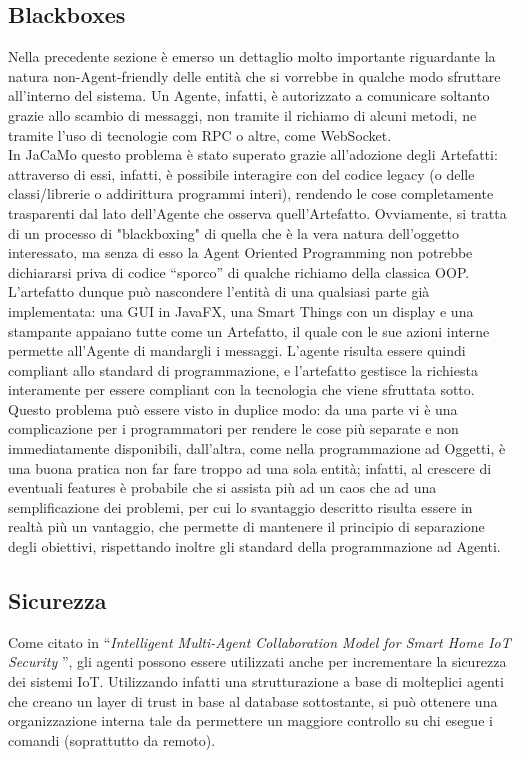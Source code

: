 \documentclass[12pt,a4paper,openright,oneside]{report}
\newcommand{\quotes}[1]{``#1''}
\begin{document}
\subsection{Blackboxes}
Nella precedente sezione è emerso un dettaglio molto importante riguardante la natura non-Agent-friendly delle entità che si vorrebbe in qualche modo sfruttare all'interno del sistema. Un Agente, infatti, è autorizzato a comunicare soltanto grazie allo scambio di messaggi, non tramite il richiamo di alcuni metodi, ne tramite l'uso di tecnologie com RPC o altre, come WebSocket.\\

In JaCaMo questo problema è stato superato grazie all'adozione degli Artefatti: attraverso di essi, infatti, è possibile interagire con del codice legacy (o delle classi/librerie o addirittura programmi interi), rendendo le cose completamente trasparenti dal lato dell'Agente che osserva quell'Artefatto. Ovviamente, si tratta di un processo di "blackboxing" di quella che è la vera natura dell'oggetto interessato, ma senza di esso la Agent Oriented Programming non potrebbe dichiararsi priva di codice \quotes{sporco} di qualche richiamo della classica OOP.\\

L'artefatto dunque può nascondere l'entità di una qualsiasi parte già implementata: una GUI in JavaFX, una Smart Things con un display e una stampante appaiano tutte come un Artefatto, il quale con le sue azioni interne permette all'Agente di mandargli i messaggi. L'agente risulta essere quindi compliant allo standard di programmazione, e l'artefatto gestisce la richiesta interamente per essere compliant con la tecnologia che viene sfruttata sotto.\\

Questo problema può essere visto in duplice modo: da una parte vi è una complicazione per i programmatori per rendere le cose più separate e non immediatamente disponibili, dall'altra, come nella programmazione ad Oggetti, è una buona pratica non far fare troppo ad una sola entità; infatti, al crescere di eventuali features è probabile che si assista più ad un caos che ad una semplificazione dei problemi, per cui lo svantaggio descritto risulta essere in realtà più un vantaggio, che permette di mantenere il principio di separazione degli obiettivi, rispettando inoltre gli standard della programmazione ad Agenti.

\subsection{Sicurezza}
Come citato in \quotes{\textit{Intelligent Multi-Agent Collaboration Model for Smart Home IoT Security} \cite{security}}, gli agenti possono essere utilizzati anche per incrementare la sicurezza dei sistemi IoT. Utilizzando infatti una strutturazione a base di molteplici agenti che creano un layer di trust in base al database sottostante, si può ottenere una organizzazione interna tale da permettere un maggiore controllo su chi esegue i comandi (soprattutto da remoto).\\
\end{document}
